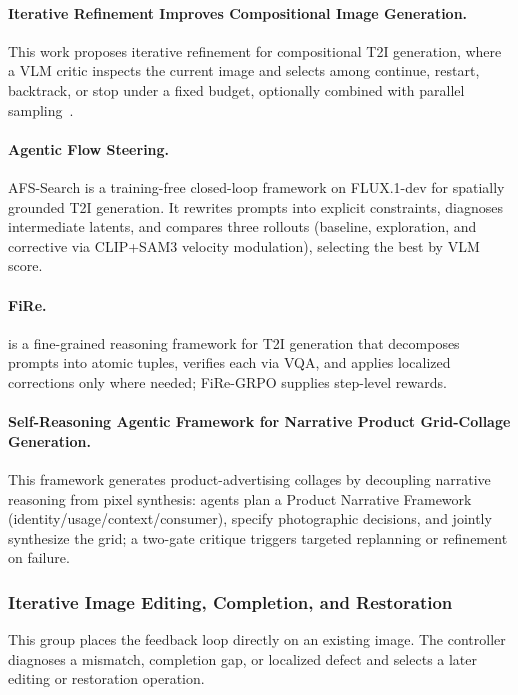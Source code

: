 \paragraph{Iterative Refinement Improves Compositional Image Generation.}
This work proposes iterative refinement for compositional T2I generation, where a VLM critic inspects the current image and selects among continue, restart, backtrack, or stop under a fixed budget, optionally combined with parallel sampling~\cite{jaiswal2026iterative}. 

\paragraph{Agentic Flow Steering.}
AFS-Search is a training-free closed-loop framework on FLUX.1-dev for spatially grounded T2I generation. It rewrites prompts into explicit constraints, diagnoses intermediate latents, and compares three rollouts (baseline, exploration, and corrective via CLIP+SAM3 velocity modulation), selecting the best by VLM score.~\cite{avg260318627}

\paragraph{FiRe.}
 is a fine-grained reasoning framework for T2I generation that decomposes prompts into atomic tuples, verifies each via VQA, and applies localized corrections only where needed; FiRe-GRPO supplies step-level rewards. ~\cite{kim2026fire}

\paragraph{Self-Reasoning Agentic Framework for Narrative Product Grid-Collage Generation.}
This framework generates product-advertising collages by decoupling narrative reasoning from pixel synthesis: agents plan a Product Narrative Framework (identity/usage/context/consumer), specify photographic decisions, and jointly synthesize the grid; a two-gate critique triggers targeted replanning or refinement on failure.~\cite{avg260416958}

\subsubsection{Iterative Image Editing, Completion, and Restoration}
This group places the feedback loop directly on an existing image. The controller diagnoses a mismatch, completion gap, or localized defect and selects a later editing or restoration operation.

